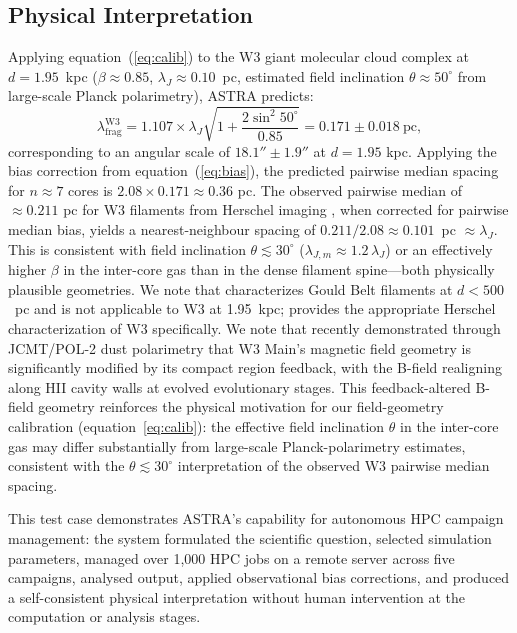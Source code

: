 \documentclass[usenatbib]{rasti}
\begin{document}
\subsection{Physical Interpretation}

Applying equation~(\ref{eq:calib}) to the W3 giant molecular cloud complex at
$d = 1.95$~kpc ($\beta \approx 0.85$, $\lambda_J \approx 0.10$~pc, estimated field
inclination $\theta \approx 50^\circ$ from large-scale Planck polarimetry), ASTRA predicts:
\begin{equation}
\lambda_\mathrm{frag}^{\mathrm{W3}} = 1.107 \times \lambda_J \sqrt{1 + \frac{2\sin^2 50^\circ}{0.85}} = 0.171 \pm 0.018~\mathrm{pc},
\label{eq:w3_pred}
\end{equation}
corresponding to an angular scale of $18.1'' \pm 1.9''$ at $d = 1.95$ kpc.
Applying the bias correction from equation~(\ref{eq:bias}), the predicted pairwise
median spacing for $n \approx 7$ cores is $2.08 \times 0.171 \approx 0.36$ pc. The
observed pairwise median of $\approx 0.211$ pc for W3 filaments from Herschel imaging
\citep{rivera2013}, when corrected for pairwise median bias, yields a nearest-neighbour
spacing of $0.211/2.08 \approx 0.101$~pc $\approx \lambda_J$. This is consistent with
field inclination $\theta \lesssim 30^\circ$ ($\lambda_{J,m} \approx 1.2\,\lambda_J$) or
an effectively higher $\beta$ in the inter-core gas than in the dense filament spine---both
physically plausible geometries. We note that \citet{arzoumanian2019} characterizes Gould
Belt filaments at $d < 500$~pc and is not applicable to W3 at 1.95~kpc; \citet{rivera2013}
provides the appropriate Herschel characterization of W3 specifically. We note that
\citet{kumar2025w3bfield} recently demonstrated through JCMT/POL-2 dust polarimetry that
W3 Main's magnetic field geometry is significantly modified by its compact  region
feedback, with the B-field realigning along HII cavity walls at evolved evolutionary stages.
This feedback-altered B-field geometry reinforces the physical motivation for our
field-geometry calibration (equation~\ref{eq:calib}): the effective field inclination
$\theta$ in the inter-core gas may differ substantially from large-scale Planck-polarimetry
estimates, consistent with the $\theta \lesssim 30^\circ$ interpretation of the observed
W3 pairwise median spacing.

This test case demonstrates ASTRA's capability for autonomous HPC campaign management:
the system formulated the scientific question, selected simulation parameters, managed over 1,000
HPC jobs on a remote server across five campaigns, analysed output, applied observational bias
corrections, and produced a self-consistent physical interpretation without human intervention at
the computation or analysis stages.
\end{document}
